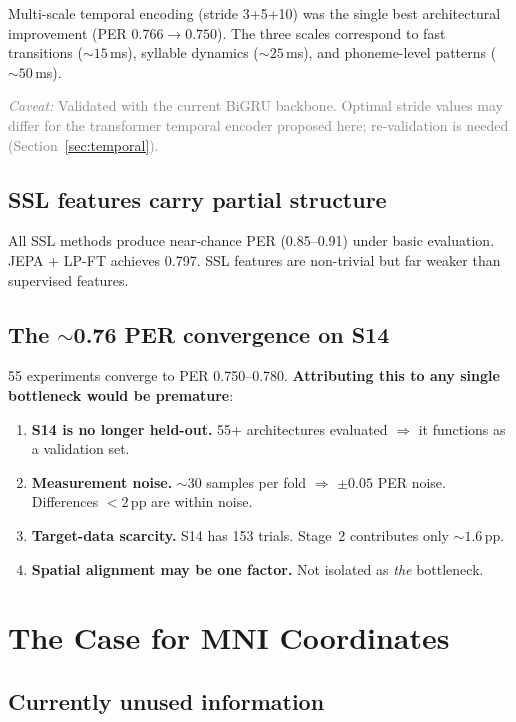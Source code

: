 \documentclass[11pt,letterpaper]{article}
\newcommand{\caveat}[1]{\par\smallskip\noindent\textcolor{gray}{\textit{Caveat:} #1}\smallskip}
\newcommand{\pp}{\,\text{pp}}
\begin{document}
Multi-scale temporal encoding (stride 3+5+10) was the single best architectural improvement (PER $0.766 \to 0.750$). The three scales correspond to fast transitions (${\sim}15$\,ms), syllable dynamics (${\sim}25$\,ms), and phoneme-level patterns (${\sim}50$\,ms).

\caveat{Validated with the current BiGRU backbone. Optimal stride values may differ for the transformer temporal encoder proposed here; re-validation is needed (Section~\ref{sec:temporal}).}

\subsection{SSL features carry partial structure}

All SSL methods produce near-chance PER (0.85--0.91) under basic evaluation. JEPA + LP-FT achieves 0.797. SSL features are non-trivial but far weaker than supervised features.

\subsection{The \texorpdfstring{${\sim}$0.76}{~0.76} PER convergence on S14}\label{sec:wall}

55 experiments converge to PER 0.750--0.780. \textbf{Attributing this to any single bottleneck would be premature}:
\begin{enumerate}[leftmargin=2em]
\item \textbf{S14 is no longer held-out.} 55+ architectures evaluated $\Rightarrow$ it functions as a validation set.
\item \textbf{Measurement noise.} ${\sim}30$ samples per fold $\Rightarrow$ ${\pm}0.05$ PER noise. Differences ${<}2\pp$ are within noise.
\item \textbf{Target-data scarcity.} S14 has 153 trials. Stage~2 contributes only ${\sim}1.6\pp$.
\item \textbf{Spatial alignment may be one factor.} Not isolated as \emph{the} bottleneck.
\end{enumerate}


\section{The Case for MNI Coordinates}

\subsection{Currently unused information}
\end{document}
